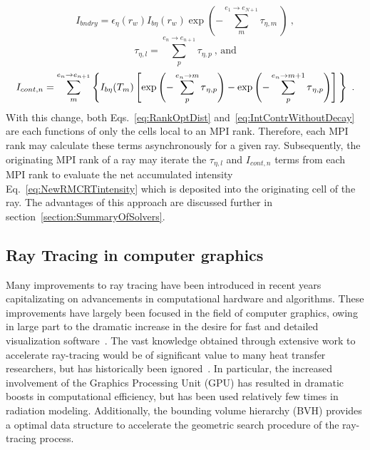 \begin{equation}
    I_{bndry}=\epsilon{}_\eta{}(r_w)I_{b\eta{}}(r_w)\exp{\left(-\sum_{m}^{e_1\rightarrow{}e_{N+1}}\tau{}_{\eta{},m}~\right)}~,
    \label{eq:Ibndry}
\end{equation}
\begin{equation}
    \tau{}_{\eta{},l}=\sum_{p}^{e_n\rightarrow{}e_{n+1}}\tau{}_{\eta{},p}~\text{, and}
    \label{eq:RankOptDist}
\end{equation}
\begin{equation}
    I_{cont,n}=\sum_{m}^{e_n\rightarrow{}e_{n+1}}\left\{ I_{b\eta}(T_m)\left[ \exp{\left(-\sum_{p}^{e_n\rightarrow{}m}\tau{}_{\eta,p}\right)}
    -\exp{\left(-\sum_{p}^{e_n\rightarrow{}m+1}\tau{}_{\eta{},p}\right)} \vphantom{\frac12}\right] \vphantom{\frac12}\right\}~.
    \label{eq:IntContrWithoutDecay}
\end{equation}
With this change, both Eqs.~\ref{eq:RankOptDist} and~\ref{eq:IntContrWithoutDecay} are each functions of only the cells local to an MPI rank. Therefore, each MPI rank may calculate these terms asynchronously for a given ray. Subsequently, the originating MPI rank of a ray may iterate the $\tau{}_{\eta,l}$ and $I_{cont,n}$ terms from each MPI rank to evaluate the net accumulated intensity Eq.~\ref{eq:NewRMCRTintensity} which is deposited into the originating cell of the ray. The advantages of this approach are discussed further in section~\ref{section:SummaryOfSolvers}.


\subsection{Ray Tracing in computer graphics}\label{section:ComputerGraphicsTracing}
Many improvements to ray tracing have been introduced in recent years capitalizating on advancements in computational hardware and algorithms.
These improvements have largely been focused in the field of computer graphics, owing in large part to the dramatic increase in the desire for fast and detailed visualization software~\cite{Gupta2020CUDAComputing}. 
The vast knowledge obtained through extensive work to accelerate ray-tracing would be of significant value to many heat transfer researchers, but has historically been ignored~\cite{Howell2021TheTransfer}. 
In particular, the increased involvement of the Graphics Processing Unit (GPU) has resulted in dramatic boosts in computational efficiency, but has been used relatively few times in radiation modeling.
Additionally, the bounding volume hierarchy (BVH) provides a optimal data structure to accelerate the geometric search procedure of the ray-tracing process.

